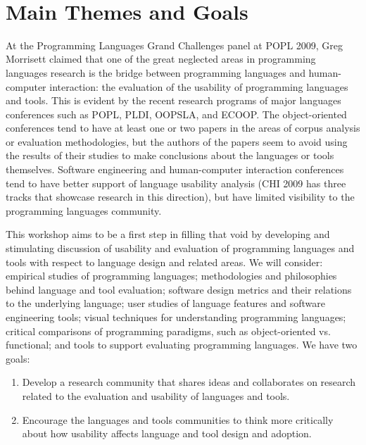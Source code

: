 \documentclass{acm_proc_article-sp}
\begin{document}
\\




\section{Main Themes and Goals}

At the Programming Languages Grand Challenges panel at POPL 2009, Greg
Morrisett claimed that one of the great neglected areas in programming
languages research is the bridge between programming languages and
human-computer interaction: the evaluation of the usability of
programming languages and tools. This is evident by the recent
research programs of major languages conferences such as POPL, PLDI,
OOPSLA, and ECOOP. The object-oriented conferences tend to have at
least one or two papers in the areas of corpus analysis or evaluation
methodologies, but the authors of the papers seem to avoid using the
results of their studies to make conclusions about the languages or
tools themselves. Software engineering and human-computer interaction
conferences tend to have better support of language usability analysis
(CHI 2009 has three tracks that showcase research in this direction),
but have limited visibility to the programming languages community.

This workshop aims to be a first step in filling that void by
developing and stimulating discussion of usability and evaluation of
programming languages and tools with respect to language design and
related areas. We will consider: empirical studies of programming
languages; methodologies and philosophies behind language and tool
evaluation; software design metrics and their relations to the
underlying language; user studies of language features and software
engineering tools; visual techniques for understanding programming
languages; critical comparisons of programming paradigms, such as
object-oriented vs. functional; and tools to support evaluating
programming languages. We have two goals:

\begin{enumerate}
  \item 
Develop a research community that shares ideas and collaborates on 
research related to the evaluation and usability of languages and tools.
\item
Encourage the languages and tools communities to think more critically
about how usability affects language and tool design and
adoption.
\end{enumerate}
\end{document}
